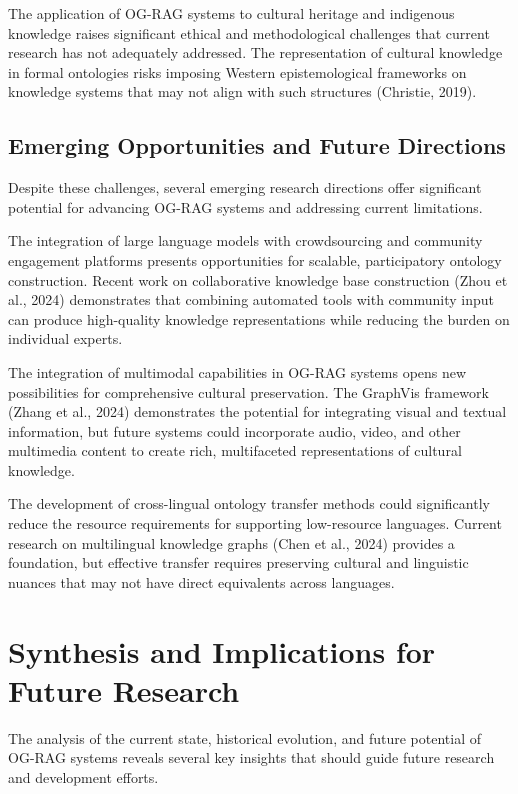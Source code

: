 \documentclass[12pt]{report}
\begin{document}
The application of OG-RAG systems to cultural heritage and indigenous knowledge raises significant ethical and methodological challenges that current research has not adequately addressed. The representation of cultural knowledge in formal ontologies risks imposing Western epistemological frameworks on knowledge systems that may not align with such structures (Christie, 2019).

\subsection{Emerging Opportunities and Future Directions}

Despite these challenges, several emerging research directions offer significant potential for advancing OG-RAG systems and addressing current limitations.

The integration of large language models with crowdsourcing and community engagement platforms presents opportunities for scalable, participatory ontology construction. Recent work on collaborative knowledge base construction (Zhou et al., 2024) demonstrates that combining automated tools with community input can produce high-quality knowledge representations while reducing the burden on individual experts.

The integration of multimodal capabilities in OG-RAG systems opens new possibilities for comprehensive cultural preservation. The GraphVis framework (Zhang et al., 2024) demonstrates the potential for integrating visual and textual information, but future systems could incorporate audio, video, and other multimedia content to create rich, multifaceted representations of cultural knowledge.

The development of cross-lingual ontology transfer methods could significantly reduce the resource requirements for supporting low-resource languages. Current research on multilingual knowledge graphs (Chen et al., 2024) provides a foundation, but effective transfer requires preserving cultural and linguistic nuances that may not have direct equivalents across languages.

\section{Synthesis and Implications for Future Research}

The analysis of the current state, historical evolution, and future potential of OG-RAG systems reveals several key insights that should guide future research and development efforts.
\end{document}
